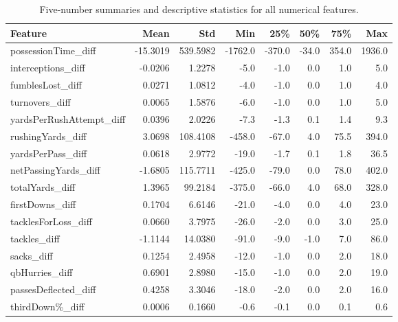 \documentclass[11pt]{amsart}
\theoremstyle{definition}                  %
\theoremstyle{remark}                       %
\numberwithin{equation}{section}
\begin{document}
\begin{table}[h!]
\centering
\small
\begin{tabular}{lrrrrrrr}
\toprule
\textbf{Feature} & \textbf{Mean} & \textbf{Std} & \textbf{Min} & \textbf{25\%} & \textbf{50\%} & \textbf{75\%} & \textbf{Max} \\
\midrule
possessionTime\_diff      & -15.3019 & 539.5982 & -1762.0 & -370.0 &  -34.0 &  354.0 & 1936.0 \\
interceptions\_diff       &  -0.0206 &   1.2278 &    -5.0 &   -1.0 &    0.0 &    1.0 &    5.0 \\
fumblesLost\_diff         &   0.0271 &   1.0812 &    -4.0 &   -1.0 &    0.0 &    1.0 &    4.0 \\
turnovers\_diff           &   0.0065 &   1.5876 &    -6.0 &   -1.0 &    0.0 &    1.0 &    5.0 \\
yardsPerRushAttempt\_diff &   0.0396 &   2.0226 &    -7.3 &   -1.3 &    0.1 &    1.4 &    9.3 \\
rushingYards\_diff        &   3.0698 & 108.4108 &  -458.0 &   -67.0 &  4.0 &   75.5 &  394.0 \\
yardsPerPass\_diff        &   0.0618 &   2.9772 &   -19.0 &   -1.7 &    0.1 &    1.8 &   36.5 \\
netPassingYards\_diff     &  -1.6805 & 115.7711 &  -425.0 &   -79.0 &    0.0 &   78.0 &  402.0 \\
totalYards\_diff          &   1.3965 &  99.2184 &  -375.0 &   -66.0 &    4.0 &   68.0 &  328.0 \\
firstDowns\_diff          &   0.1704 &   6.6146 &   -21.0 &   -4.0 &    0.0 &    4.0 &   23.0 \\
tacklesForLoss\_diff      &   0.0660 &   3.7975 &   -26.0 &   -2.0 &    0.0 &    3.0 &   25.0 \\
tackles\_diff             &  -1.1144 &  14.0380 &   -91.0 &   -9.0 &   -1.0 &    7.0 &   86.0 \\
sacks\_diff               &   0.1254 &   2.4958 &   -12.0 &   -1.0 &    0.0 &    2.0 &   18.0 \\
qbHurries\_diff           &   0.6901 &   2.8980 &   -15.0 &   -1.0 &    0.0 &    2.0 &   19.0 \\
passesDeflected\_diff     &   0.4258 &   3.3046 &   -18.0 &   -2.0 &    0.0 &    2.0 &   16.0 \\
thirdDown\%\_diff         &   0.0006 &   0.1660 &   -0.6  &   -0.1 &    0.0 &    0.1 &   0.6 \\
\bottomrule
\end{tabular}
\caption{Five-number summaries and descriptive statistics for all numerical features.}
\label{tab:five_number_summary}
\end{table}
\newpage 
\end{document}

